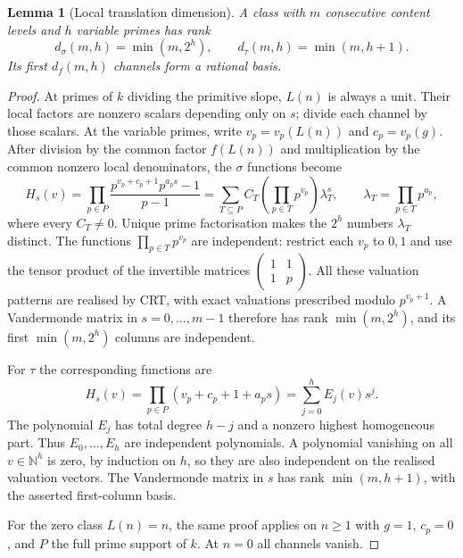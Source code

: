 \documentclass[11pt,a4paper]{article}
\newtheorem{lemma}[theorem]{Lemma}
\theoremstyle{definition}\newtheorem{definition}[theorem]{Definition}
\theoremstyle{remark}\newtheorem*{remark}{Remark}
\newcommand{\N}{\mathbb N}\newcommand{\Q}{\mathbb Q}\newcommand{\Z}{\mathbb Z}\newcommand{\C}{\mathbb C}
\begin{document}
\begin{lemma}[Local translation dimension]\label{lem:localdimension}
A class with $m$ consecutive content levels and $h$ variable primes has rank
\[
 d_\sigma(m,h)=\min(m,2^h),\qquad
 d_\tau(m,h)=\min(m,h+1).
\]
Its first $d_f(m,h)$ channels form a rational basis.
\end{lemma}
\begin{proof}
At primes of $k$ dividing the primitive slope, $L(n)$ is always a unit. Their
local factors are nonzero scalars depending only on $s$; divide each channel
by those scalars. At the variable primes, write $v_p=v_p(L(n))$ and
$c_p=v_p(g)$. After division by the common factor $f(L(n))$ and multiplication
by the common nonzero local denominators, the $\sigma$ functions become
\[
 H_s(v)=\prod_{p\in P}
 \frac{p^{v_p+c_p+1}p^{a_p s}-1}{p-1}
 =\sum_{T\subseteq P}C_T
       \left(\prod_{p\in T}p^{v_p}\right)\lambda_T^s,
 \qquad \lambda_T=\prod_{p\in T}p^{a_p},
\]
where every $C_T\ne0$. Unique prime factorisation makes the $2^h$ numbers
$\lambda_T$ distinct. The functions $\prod_{p\in T}p^{v_p}$ are independent:
restrict each $v_p$ to $0,1$ and use the tensor product of the invertible
matrices $\left(\begin{smallmatrix}1&1\\1&p\end{smallmatrix}\right)$.
All these valuation patterns are realised by CRT, with exact valuations
prescribed modulo $p^{v_p+1}$. A Vandermonde matrix in $s=0,\ldots,m-1$
therefore has rank $\min(m,2^h)$, and its first $\min(m,2^h)$ columns are
independent.

For $\tau$ the corresponding functions are
\[
 H_s(v)=\prod_{p\in P}(v_p+c_p+1+a_p s)
       =\sum_{j=0}^h E_j(v)s^j.
\]
The polynomial $E_j$ has total degree $h-j$ and a nonzero highest homogeneous
part. Thus $E_0,\ldots,E_h$ are independent polynomials. A polynomial
vanishing on all $v\in\N^h$ is zero, by induction on $h$, so they are also
independent on the realised valuation vectors. The Vandermonde matrix in
$s$ has rank $\min(m,h+1)$, with the asserted first-column basis.

For the zero class $L(n)=n$, the same proof applies on $n\ge1$ with $g=1$,
$c_p=0$, and $P$ the full prime support of $k$. At $n=0$ all channels vanish.
\end{proof}
\end{document}
